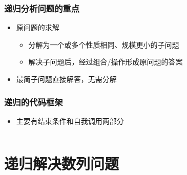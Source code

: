 \begin{frame}[fragile]
    \frametitle{递归分析问题的重点}

    \begin{itemize}
        \item 原问题的求解
        \begin{itemize}
            \item 分解为一个或多个性质相同、规模更小的子问题
            \item 解决子问题后，经过组合/操作形成原问题的答案
        \end{itemize}
        \item 最简子问题直接解答，无需分解
    \end{itemize}

\end{frame}

\begin{frame}[fragile]
    \frametitle{递归的代码框架}

    \begin{itemize}
        \item 主要有结束条件和自我调用两部分
        
        \begin{columns}
            
            
        \end{columns}
    \end{itemize}

\end{frame}


\section{递归解决数列问题}

